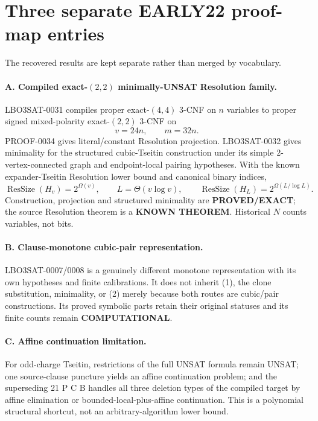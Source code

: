 \documentclass[11pt]{article}
\newcommand{\EXACT}{\textbf{PROVED/EXACT}}
\newcommand{\KNOWN}{\textbf{KNOWN THEOREM}}
\newcommand{\COMP}{\textbf{COMPUTATIONAL}}
\begin{document}
\section{Three separate EARLY22 proof-map entries}
The recovered results are kept separate rather than merged by vocabulary.

\paragraph{A. Compiled exact-$(2,2)$ minimally-UNSAT Resolution family.}
LBO3SAT-0031 compiles proper exact-$(4,4)$ 3-CNF on $n$ variables to proper
signed mixed-polarity exact-$(2,2)$ 3-CNF on
\[
                         v=24n,\qquad m=32n.                \tag{1}
\]
PROOF-0034 gives literal/constant Resolution projection.  LBO3SAT-0032 gives
minimality for the structured cubic-Tseitin construction under its simple
2-vertex-connected graph and endpoint-local pairing hypotheses.  With the
known expander-Tseitin Resolution lower bound and canonical binary indices,
\[
 \operatorname{ResSize}(H_v)=2^{\Omega(v)},\qquad
 L=\Theta(v\log v),\qquad
 \operatorname{ResSize}(H_L)=2^{\Omega(L/\log L)}.          \tag{2}
\]
Construction, projection and structured minimality are \EXACT; the source
Resolution theorem is a \KNOWN.  Historical $N$ counts variables, not bits.

\paragraph{B. Clause-monotone cubic-pair representation.}
LBO3SAT-0007/0008 is a genuinely different monotone representation with its
own hypotheses and finite calibrations.  It does not inherit (1), the clone
substitution, minimality, or (2) merely because both routes are cubic/pair
constructions.  Its proved symbolic parts retain their original statuses and
its finite counts remain \COMP.

\paragraph{C. Affine continuation limitation.}
For odd-charge Tseitin, restrictions of the full UNSAT formula remain UNSAT;
one source-clause puncture yields an affine continuation problem; and the
superseding 21 P C B handles all three deletion types of the compiled target
by affine elimination or bounded-local-plus-affine continuation.  This is a
polynomial structural shortcut, not an arbitrary-algorithm lower bound.
\end{document}
